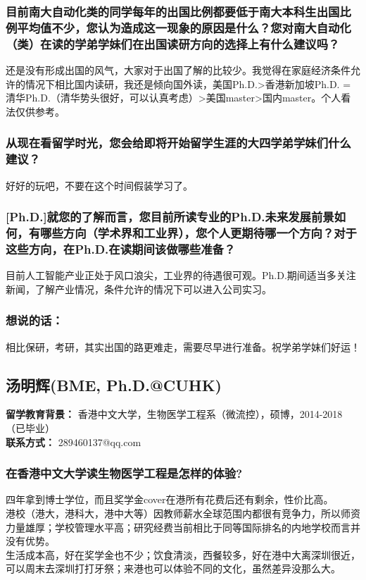 \documentclass[a4paper,UTF8]{book}
\begin{document}
    \subsubsection*{目前南大自动化类的同学每年的出国比例都要低于南大本科生出国比例平均值不少，您认为造成这一现象的原因是什么？您对南大自动化（类）在读的学弟学妹们在出国读研方向的选择上有什么建议吗？}
    还是没有形成出国的风气，大家对于出国了解的比较少。我觉得在家庭经济条件允许的情况下相比国内读研，我还是倾向国外读，美国Ph.D.>香港新加坡Ph.D. = 清华Ph.D.（清华势头很好，可以认真考虑）>美国master>国内master。个人看法仅供参考。
    
    \subsubsection*{从现在看留学时光，您会给即将开始留学生涯的大四学弟学妹们什么建议？}
    好好的玩吧，不要在这个时间假装学习了。
    
    \subsubsection*{[Ph.D.]就您的了解而言，您目前所读专业的Ph.D.未来发展前景如何，有哪些方向（学术界和工业界），您个人更期待哪一个方向？对于这些方向，在Ph.D.在读期间该做哪些准备？}
    目前人工智能产业正处于风口浪尖，工业界的待遇很可观。Ph.D.期间适当多关注新闻，了解产业情况，条件允许的情况下可以进入公司实习。

    \subsubsection{想说的话：}
    相比保研，考研，其实出国的路更难走，需要尽早进行准备。祝学弟学妹们好运！

        
        

   


\clearpage
\subsection{汤明辉(BME, Ph.D.@CUHK)}
    \textbf{留学教育背景：} 香港中文大学，生物医学工程系（微流控），硕博，2014-2018（已毕业）\\
    \textbf{联系方式：} 289460137@qq.com

    \subsubsection*{在香港中文大学读生物医学工程是怎样的体验?}
    四年拿到博士学位，而且奖学金cover在港所有花费后还有剩余，性价比高。\\
    港校（港大，港科大，港中大等）因教师薪水全球范围内都很有竞争力，所以师资力量雄厚；学校管理水平高；研究经费当前相比于同等国际排名的内地学校而言并没有优势。\\
    生活成本高，好在奖学金也不少；饮食清淡，西餐较多，好在港中大离深圳很近，可以周末去深圳打打牙祭；来港也可以体验不同的文化，虽然差异没那么大。
\end{document}
